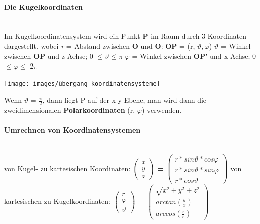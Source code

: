 \documentclass[7pt]{article}
\begin{document}
\begin{multicols*}{3}
\paragraph{Die Kugelkoordinaten}

\mbox{}\\
Im Kugelkoordinatensystem wird ein Punkt \textbf{P} im Raum durch 3 Koordinaten dargestellt, wobei 
\newline \textit{r} = Abstand zwischen \textbf{O} und \textbf{O}: \textbf{OP} = (r, $\vartheta, \varphi$) 
\newline $\vartheta$ = Winkel zwischen \textbf{OP} und z-Achse; 0 $\leq \vartheta \leq \pi$
\newline $\varphi$ = Winkel zwischen \textbf{OP'} und x-Achse; 0 $\leq \varphi \leq$ 2$\pi$
\begin{center}
	\texttt{[image: images/übergang\_koordinatensysteme]}
\end{center}
Wenn $\vartheta$ = $\frac{\pi}{2}$, dann liegt P auf der x-y-Ebene, man wird dann die zweidimensionalen \textbf{Polarkoordinaten} (r, $\varphi$) verwenden.


\paragraph{Umrechnen von Koordinatensystemen}

\mbox{}\\von Kugel- zu kartesischen Koordinaten:
\newline 
$\begin{pmatrix} 
	x \\ y \\ z 
\end{pmatrix} $ 
\textbf{=}
$\begin{pmatrix}
	r*sin\vartheta*cos\varphi \\ r*sin\vartheta*sin\varphi \\ r*cos\vartheta
\end{pmatrix}$
\newline
\newline
\newline von kartesischen zu Kugelkoordinaten:
\newline $\begin{pmatrix} 
	r \\ \varphi \\ \vartheta 
\end{pmatrix} $ 
\textbf{=}
$\begin{pmatrix}
	\sqrt{x^{2}+ y^{2} + z^{2}} \\ arctan(\frac{y}{x}) \\ arccos(\frac{z}{r})
\end{pmatrix}$


\end{multicols*}
\end{document}
